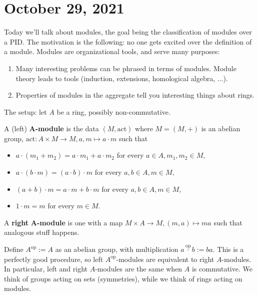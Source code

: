 \section{October 29, 2021} 
Today we'll talk about modules, the goal being the classification of modules over a PID. The motivation is the following: no one gets excited over the definition of a module. Modules are organizational tools, and serve many purposes:
\begin{enumerate}[label=(\arabic*)]
\setlength\itemsep{-.2em}
    \item Many interesting problems can be phrased in terms of modules. Module theory leads to tools (induction, extensions, homological algebra, ...).
    \item Properties of modules in the aggregate tell you interesting things about rings.
\end{enumerate}
The setup: let $A$ be a ring, possibly non-commutative.
\begin{definition}[]
    A (left) $\mathbf A$\textbf{-module} is the data $(M, \mathrm{act})$ where $M=(M,+)$ is an abelian group, $\mathrm{act}\colon A \times M \to M, a,m \mapsto a\cdot m$ such that 
    \begin{itemize}
    \setlength\itemsep{-.2em}
\item $a\cdot (m_1+m_2)=a \cdot m_1+a\cdot m_2$ for every $a \in A, m_1,m_2 \in M$,
\item $a\cdot (b\cdot m)=(a\cdot b)\cdot m$ for every $a,b \in A, m \in M$, 
\item $(a+b)\cdot m=a\cdot m+b\cdot m$ for every $a,b \in A, m \in M$,
\item $1\cdot m =m$ for every $m \in M$.
    \end{itemize}
    A \textbf{right} $\mathbf A$\textbf{-module} is one with a map $M \times A \to M, (m,a) \mapsto  ma$ such that analogous stuff happens.
\end{definition}
Define $A ^{\mathrm{op}}:=A$ as an abelian group, with multiplication $a \overset{\mathrm{op}}{\cdot }b:=ba $. This is a perfectly good procedure, so left $A ^{\mathrm{op}}$-modules are equivalent to right $A$-modules. In particular, left and right $A$-modules are the same when $A$ is commutative.
We think of groups acting on sets (symmetries), while we think of rings acting on modules.
